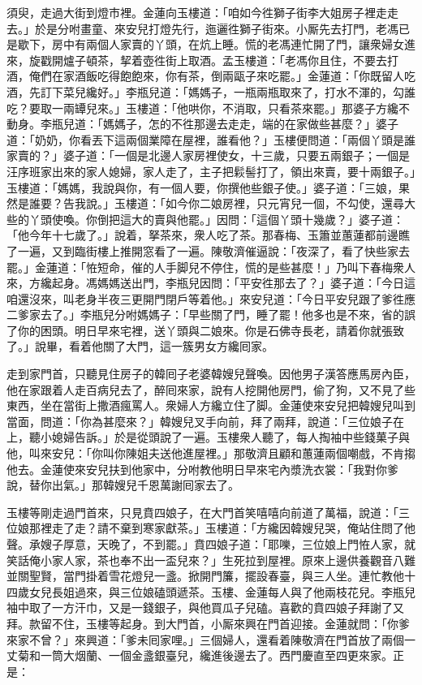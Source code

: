 須臾，走過大街到燈市裡。金蓮向玉樓道：「咱如今徃獅子街李大姐房子裡走走去。」於是分咐畫童、來安兒打燈先行，迤邐徃獅子街來。小厮先去打門，老馮已是歇下，房中有兩個人家賣的丫頭，在炕上睡。慌的老馮連忙開了門，讓衆婦女進來，旋戳開爐子頓茶，挈着壺徃街上取酒。孟玉樓道：「老馮你且住，不要去打酒，俺們在家酒飯吃得飽飽來，你有茶，倒兩甌子來吃罷。」金蓮道：「你既留人吃酒，先訂下菜兒纔好。」李瓶兒道：「媽媽子，一瓶兩瓶取來了，打水不渾的，勾誰吃？要取一兩罈兒來。」{}玉樓道：「他哄你，不消取，只看茶來罷。」那婆子方纔不動身。李瓶兒道：「媽媽子，怎的不徃那邊去走走，端的在家做些甚麼？」婆子道：「奶奶，你看丟下這兩個業障在屋裡，誰看他？」玉樓便問道：「兩個丫頭是誰家賣的？」婆子道：「一個是北邊人家房裡使女，十三歲，只要五兩銀子；一個是汪序班家出來的家人媳婦，家人走了，主子把鬏髻打了，領出來賣，要十兩銀子。」玉樓道：「媽媽，我說與你，有一個人要，你撰他些銀子使。」婆子道：「三娘，果然是誰要？告我說。」玉樓道：「如今你二娘房裡，只元宵兒一個，不勾使，還尋大些的丫頭使喚。你倒把這大的賣與他罷。」因問：「這個丫頭十幾歲？」婆子道：「他今年十七歲了。」說着，拏茶來，衆人吃了茶。那春梅、玉簫並蕙蓮都前邊瞧了一遍，又到臨街樓上推開窓看了一遍。陳敬濟催逼說：「夜深了，看了快些家去罷。」金蓮道：「恠短命，催的人手脚兒不停住，慌的是些甚麼！」乃叫下春梅衆人來，方纔起身。馮媽媽送出門，李瓶兒因問：「平安徃那去了？」婆子道：「今日這咱還沒來，叫老身半夜三更開門閉戶等着他。」來安兒道：「今日平安兒跟了爹徃應二爹家去了。」李瓶兒分咐媽媽子：「早些關了門，睡了罷！他多也是不來，省的誤了你的困頭。明日早來宅裡，送丫頭與二娘來。你是石佛寺長老，請着你就張致了。」說畢，看着他關了大門，這一簇男女方纔囘家。

走到家門首，只聽見住房子的韓囘子老婆韓嫂兒聲喚。{}因他男子漢答應馬房內臣，他在家跟着人走百病兒去了，醉囘來家，說有人挖開他房門，偷了狗，又不見了些東西，坐在當街上撒酒瘋罵人。衆婦人方纔立住了脚。金蓮使來安兒把韓嫂兒叫到當面，問道：「你為甚麼來？」韓嫂兒叉手向前，拜了兩拜，說道：「三位娘子在上，聽小媳婦告訴。」於是從頭說了一遍。玉樓衆人聽了，每人掏袖中些錢菓子與他，叫來安兒：「你叫你陳姐夫送他進屋裡。」那敬濟且顧和蕙蓮兩個嘲戲，不肯搊他去。金蓮使來安兒扶到他家中，分咐教他明日早來宅內漿洗衣裳：「我對你爹說，替你出氣。」那韓嫂兒千恩萬謝囘家去了。

玉樓等剛走過門首來，只見賁四娘子，{}在大門首笑嘻嘻向前道了萬福，說道：「三位娘那裡走了走？請不棄到寒家獻茶。」玉樓道：「方纔因韓嫂兒哭，俺站住問了他聲。承嫂子厚意，天晚了，不到罷。」賁四娘子道：「耶嚛，三位娘上門恠人家，就笑話俺小家人家，茶也奉不出一盃兒來？」生死拉到屋裡。原來上邊供養觀音八難並關聖賢，當門掛着雪花燈兒一盞。掀開門簾，擺設春臺，與三人坐。連忙教他十四歲女兒長姐過來，與三位娘磕頭遞茶。玉樓、金蓮每人與了他兩枝花兒。李瓶兒袖中取了一方汗巾，又是一錢銀子，與他買瓜子兒磕。喜歡的賁四娘子拜謝了又拜。款留不住，玉樓等起身。到大門首，小厮來興在門首迎接。金蓮就問：「你爹來家不曾？」來興道：「爹未囘家哩。」三個婦人，還看着陳敬濟在門首放了兩個一丈菊和一筒大烟蘭、一個金盞銀臺兒，纔進後邊去了。{}西門慶直至四更來家。正是：

